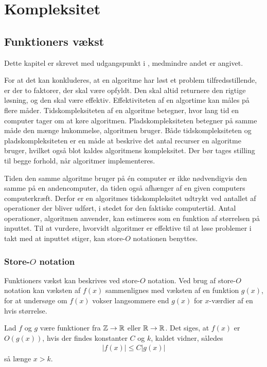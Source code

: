 \chapter{Kompleksitet}
\section{Funktioners vækst}
Dette kapitel er skrevet med udgangspunkt i \citep{dmat}, medmindre andet er angivet. 

For at det kan konkluderes, at en algoritme har løst et problem tilfredsstillende, er der to faktorer, der skal være opfyldt. Den skal altid returnere den rigtige løsning, og den skal være effektiv. 
Effektiviteten af en algortime kan måles på flere måder.
Tidskompleksiteten af en algoritme betegner, hvor lang tid en computer tager om at køre algoritmen.
Pladskompleksiteten betegner på samme måde den mænge hukommelse, algoritmen bruger.
Både tidskompleksiteten og pladskompleksiteten er en måde at beskrive det antal recurser en algoritme bruger, hvilket også blot kaldes algoritmens kompleksitet.
Der bør tages stilling til begge forhold, når algoritmer implementeres.

Tiden den samme algoritme bruger på én computer er ikke nødvendigvis den samme på en andencomputer, da tiden også afhænger af en given computers computerkræft.
Derfor er en algoritmes tidskompleksitet udtrykt ved antallet af operationer der bliver udført, i stedet for den faktiske computertid.
Antal operationer, algoritmen anvender, kan estimeres som en funktion af størrelsen på inputtet. 
Til at vurdere, hvorvidt algoritmer er effektive til at løse problemer i takt med at inputtet stiger, kan store-$O$ notationen benyttes.

\subsection{Store-$O$ notation}
Funktioners vækst kan beskrives ved store-$O$ notation.
Ved brug af store-$O$ notation kan væksten af $f(x)$ sammenlignes med væksten af en funktion $g(x)$, for at undersøge om $f(x)$ vokser langsommere end $g(x)$ for $x$-værdier af en hvis størrelse.

\begin{defn}\label{eq_o}
	Lad $f$ og $g$ være funktioner fra $\mathbb{Z} \to \mathbb{R}$ eller $\mathbb{R} \to \mathbb{R}$.
	Det siges, at $f(x)$ er $O(g(x))$, hvis der findes konstanter $C$ og $k$, kaldet vidner, således 
	\begin{align*}
		|f(x)| \leq C |g(x)|
	\end{align*}
	så længe $x>k$.
\end{defn}

